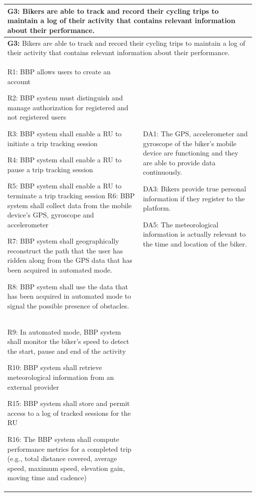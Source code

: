 \documentclass{article}
\begin{document}
\newpage
\begin{longtable}{|p{}|p{}|}
    \hline
    \multicolumn{2}{|p{\dimexpr\textwidth-2\tabcolsep-2\arrayrulewidth}|}{
        \textbf{G3:} Bikers are able to track and record their cycling trips to maintain a log of their activity that contains relevant information about their performance.
    } \\
    \hline
    \endfirsthead
    \hline
    \multicolumn{2}{|p{\dimexpr\textwidth-2\tabcolsep-2\arrayrulewidth}|}{
        \textbf{G3:} Bikers are able to track and record their cycling trips to maintain a log of their activity that contains relevant information about their performance.
    } \\
    \hline
    \endhead
 
    R1: BBP allows users to create an account \par
    R2: BBP system must distinguish and manage authorization for registered and not registered users \par
    R3: BBP system shall enable a RU to initiate a trip tracking session \par
    R4: BBP system shall enable a RU to pause a trip tracking session \par
    R5: BBP system shall enable a RU to terminate a trip tracking session
    R6: BBP system shall collect data from the mobile device’s GPS, gyroscope and accelerometer \par
    R7: BBP system shall geographically reconstruct the path that the user has ridden along from the GPS data that has been acquired in automated mode. \par
    R8: BBP system shall use the data that has been acquired in automated mode to signal the possible presence of obstacles. 
    & 
    DA1: The GPS, accelerometer and gyroscope of the biker’s mobile device are functioning and they are able to provide data continuously.   \par
    DA3: Bikers provide true personal information if they register to the platform. \par
    DA5: The meteorological information is actually relevant to the time and location of the biker. \\
    R9: In automated mode, BBP system shall monitor the biker’s speed to detect the start, pause and end of the activity \par
    R10: BBP system shall retrieve meteorological information from an external provider \par
    R15: BBP system shall store and permit access to a log of tracked sessions for the RU \par
    R16: The BBP system shall compute performance metrics for a completed trip (e.g., total distance covered, average speed, maximum speed, elevation gain, moving time and cadence) & \par
    \\
    \hline

\end{longtable}
\end{document}
